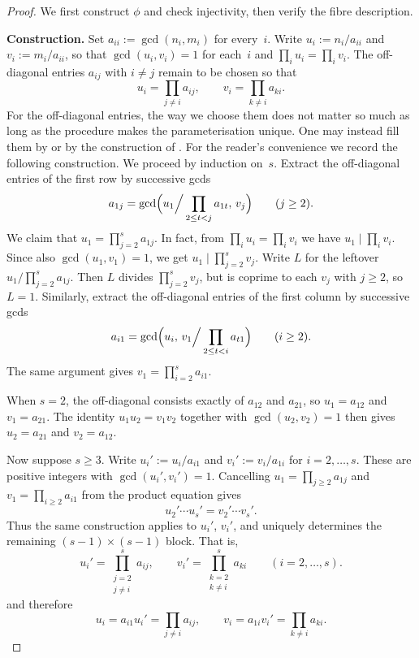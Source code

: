 \begin{proof}
We first construct $\phi$ and check injectivity, then verify the fibre description.

\smallskip\noindent\textbf{Construction.}
Set $a_{ii}:=\gcd(n_i,m_i)$ for every~$i$. Write $u_i:=n_i/a_{ii}$ and
$v_i:=m_i/a_{ii}$, so that $\gcd(u_i,v_i)=1$ for each~$i$ and
$\prod_i u_i=\prod_i v_i$.
The off-diagonal entries $a_{ij}$ with $i\neq j$ remain to be chosen so that
\[
u_i=\prod_{j\neq i}a_{ij},\qquad
v_i=\prod_{k\neq i}a_{ki}.
\]
For the off-diagonal entries, the way we choose them does not matter so much as long as the procedure makes the parameterisation unique.
One may instead fill them by \cite[Lemma~2.3]{BNR} or by the construction of \cite[\S8]{VW}.
For the reader's convenience we record the following construction.
We proceed by induction on~$s$.
Extract the off-diagonal entries of the first row by successive gcds
\[
a_{1j}=\gcd\Bigl(u_1\Big/\prod_{2\leq t<j}a_{1t},\,v_j\Bigr)
\qquad(j\geq 2).
\]
We claim that $u_1=\prod_{j=2}^s a_{1j}$.
In fact, from $\prod_i u_i=\prod_i v_i$ we have $u_1\mid\prod_i v_i$.
Since also $\gcd(u_1,v_1)=1$, we get $u_1\mid\prod_{j=2}^s v_j$.
Write $L$ for the leftover $u_1\big/\prod_{j=2}^s a_{1j}$.
Then $L$ divides $\prod_{j=2}^s v_j$, but is coprime to each $v_j$ with $j\geq 2$, so $L=1$.
Similarly, extract the off-diagonal entries of the first column by successive gcds
\[
a_{i1}=\gcd\Bigl(u_i,\,v_1\Big/\prod_{2\leq t<i}a_{t1}\Bigr)
\qquad(i\geq 2).
\]
The same argument gives $v_1=\prod_{i=2}^s a_{i1}$.

When $s=2$, the off-diagonal consists exactly of $a_{12}$ and $a_{21}$, so $u_1=a_{12}$ and $v_1=a_{21}$. The identity $u_1 u_2=v_1 v_2$ together with $\gcd(u_2,v_2)=1$ then gives $u_2=a_{21}$ and $v_2=a_{12}$.

Now suppose $s\geq 3$.
Write $u_i':=u_i/a_{i1}$ and $v_i':=v_i/a_{1i}$ for $i=2,\ldots,s$.
These are positive integers with $\gcd(u_i',v_i')=1$. Cancelling
$u_1=\prod_{j\geq 2}a_{1j}$ and $v_1=\prod_{i\geq 2}a_{i1}$ from the
product equation gives
\[
u_2'\cdots u_s'=v_2'\cdots v_s'.
\]
Thus the same construction applies to $u_i'$, $v_i'$,
and uniquely determines the remaining $(s-1)\times(s-1)$ block. That is,
\[
u_i'=\prod_{\substack{j=2\\ j\neq i}}^s a_{ij},\qquad
v_i'=\prod_{\substack{k=2\\ k\neq i}}^s a_{ki}
\qquad(i=2,\ldots,s).
\]
and therefore
\[
u_i=a_{i1}u_i'=\prod_{j\neq i}a_{ij},\qquad
v_i=a_{1i}v_i'=\prod_{k\neq i}a_{ki}.
\]


\end{proof}
